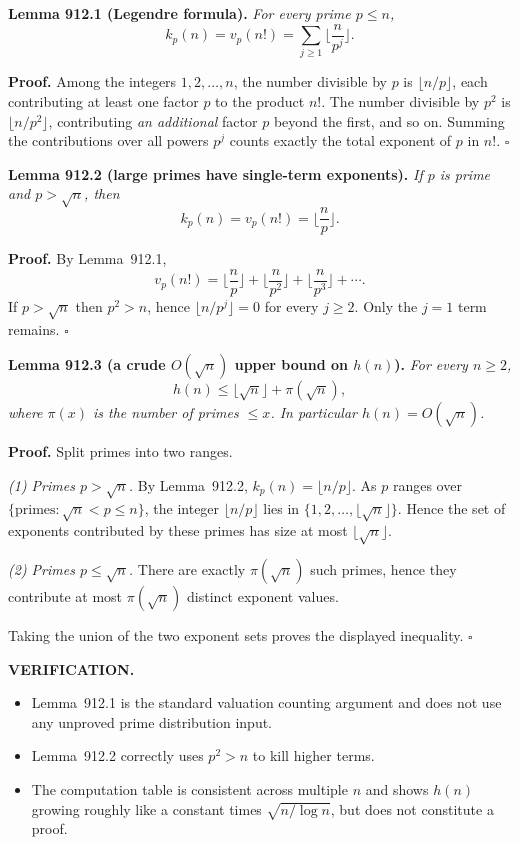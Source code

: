 \medskip
\noindent\textbf{Lemma 912.1 (Legendre formula).}  \emph{For every prime $p\le n$,}
\[
 k_p(n)=v_p(n!)=\sum_{j\ge 1} \Big\lfloor \frac{n}{p^j}\Big\rfloor.
\]

\noindent\textbf{Proof.} Among the integers $1,2,\dots,n$, the number divisible by $p$ is $\lfloor n/p\rfloor$, each contributing at least one factor $p$ to the product $n!$. The number divisible by $p^2$ is $\lfloor n/p^2\rfloor$, contributing \emph{an additional} factor $p$ beyond the first, and so on. Summing the contributions over all powers $p^j$ counts exactly the total exponent of $p$ in $n!$. \hfill$\square$

\medskip
\noindent\textbf{Lemma 912.2 (large primes have single-term exponents).}  \emph{If $p$ is prime and $p>\sqrt{n}$, then}
\[
 k_p(n)=v_p(n!) = \Big\lfloor \frac{n}{p}\Big\rfloor.
\]

\noindent\textbf{Proof.} By Lemma~912.1,
\[
 v_p(n!)=\Big\lfloor \frac{n}{p}\Big\rfloor + \Big\lfloor \frac{n}{p^2}\Big\rfloor+\Big\lfloor \frac{n}{p^3}\Big\rfloor+\cdots.
\]
If $p>\sqrt{n}$ then $p^2>n$, hence $\lfloor n/p^j\rfloor=0$ for every $j\ge 2$. Only the $j=1$ term remains. \hfill$\square$

\medskip
\noindent\textbf{Lemma 912.3 (a crude $O(\sqrt n)$ upper bound on $h(n)$).}  \emph{For every $n\ge 2$,}
\[
 h(n) \le \lfloor \sqrt{n}\rfloor + \pi(\sqrt{n}),
\]
\emph{where $\pi(x)$ is the number of primes $\le x$. In particular $h(n)=O(\sqrt{n})$.}

\noindent\textbf{Proof.} Split primes into two ranges.

\emph{(1) Primes $p>\sqrt{n}$.} By Lemma~912.2, $k_p(n)=\lfloor n/p\rfloor$. As $p$ ranges over $\{\text{primes}:\sqrt{n}<p\le n\}$, the integer $\lfloor n/p\rfloor$ lies in $\{1,2,\dots,\lfloor\sqrt{n}\rfloor\}$. Hence the set of exponents contributed by these primes has size at most $\lfloor\sqrt{n}\rfloor$.

\emph{(2) Primes $p\le \sqrt{n}$.} There are exactly $\pi(\sqrt{n})$ such primes, hence they contribute at most $\pi(\sqrt{n})$ distinct exponent values.

Taking the union of the two exponent sets proves the displayed inequality. \hfill$\square$

\medskip
\noindent\textbf{VERIFICATION.}\\
\begin{itemize}
\item Lemma~912.1 is the standard valuation counting argument and does not use any unproved prime distribution input.
\item Lemma~912.2 correctly uses $p^2>n$ to kill higher terms.
\item The computation table is consistent across multiple $n$ and shows $h(n)$ growing roughly like a constant times $\sqrt{n/\log n}$, but does not constitute a proof.
\end{itemize}

